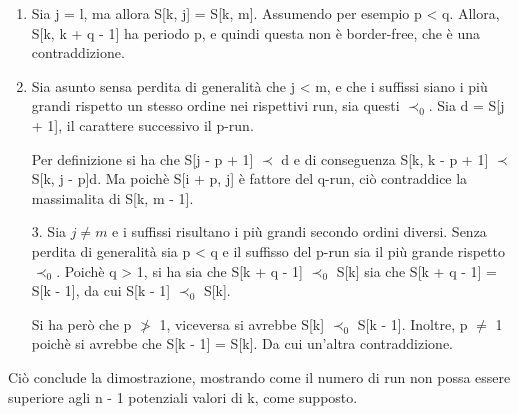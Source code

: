 \documentclass{beamer}
\begin{document}
    \begin{frame}
        \begin{enumerate}
            \item Sia j = l, ma allora S[k, j] = S[k, m].
                Assumendo per esempio p < q. Allora, S[k, k + q - 1] ha periodo p,
                e quindi questa non è border-free, che è una contraddizione.

            \item Sia asunto sensa perdita di generalità che j < m, 
                e che i suffissi siano i più grandi rispetto un stesso ordine nei rispettivi run, sia questi \(\prec_{0}\).
                Sia d = S[j + 1], il carattere successivo il p-run.
                
                Per definizione si ha che S[j - p + 1] \(\prec\) d e di conseguenza S[k, k - p + 1] \(\prec\) S[k, j - p]d. 
                Ma poichè S[i + p, j] è fattore del q-run, ciò contraddice la massimalita di S[k, m - 1].
        \end{enumerate}
    \end{frame}
    \begin{frame}
        \begin{enumerate}
            \item [3.] Sia \(j \ne m\) e i suffissi risultano i più grandi secondo ordini diversi.
                Senza perdita di generalità sia p < q e il suffisso del p-run
                sia il più grande rispetto \(\prec_{0}\).
                Poichè q > 1, si ha sia che S[k + q - 1] \(\prec_{0}\) S[k] sia che 
                S[k + q - 1] = S[k  - 1], da cui S[k - 1] \(\prec_{0}\) S[k].
                
                Si ha però che p \(\not>\) 1, viceversa si avrebbe S[k] \(\prec_{0}\) S[k - 1]. 
                Inoltre, p \(\ne\) 1 poichè si avrebbe che S[k - 1] = S[k]. 
                Da cui un'altra contraddizione.
        \end{enumerate}

        Ciò conclude la dimostrazione, 
        mostrando come il numero di run non possa essere superiore agli n - 1 
        potenziali valori di k, come supposto.
    \end{frame}
\end{document}

